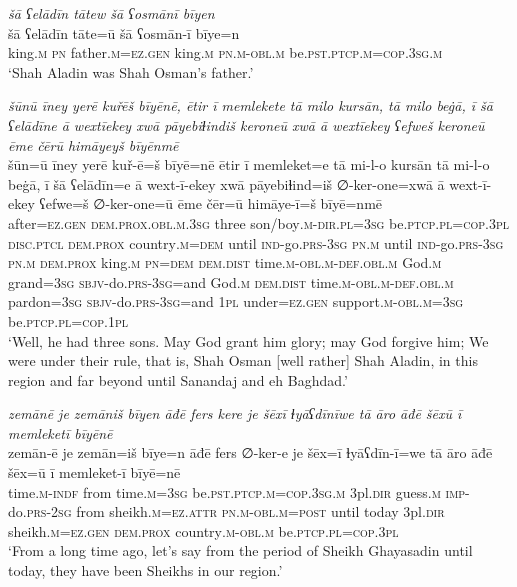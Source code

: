 \ea \label{DG.2}
\textit{šā ʕelādīn tātew šā ʕosmānī bīyen} \\ 
\gll šā ʕelādīn tāte=ū šā ʕosmān-ī bīye=n \\ 
 king\textsc{.m} \textsc{pn} father\textsc{.m}\textsc{=ez}\textsc{.gen} king\textsc{.m} \textsc{pn}\textsc{.m}\textsc{-obl}\textsc{.m} be\textsc{.pst}\textsc{.ptcp}\textsc{.m}\textsc{=cop}\textsc{.3sg}\textsc{.m} \\ 
\glt `Shah Aladin was Shah Osman’s father.'
\z 
 
\ea \label{DG.4}
\textit{šūnū īney yerē kuřēš bīyēnē, ētir ī memlekete tā milo kursān, tā milo beġā, ī šā ʕelādīne ā wextīekey xwā pāyebiɫindiš keroneū xwā ā wextīekey ʕefweš keroneū ēme čērū himāyeyš bīyēnmē} \\ 
\gll šūn=ū īney yerē kuř-ē=š bīyē=nē ētir ī memleket=e tā mi-l-o kursān tā mi-l-o beġā, ī šā ʕelādīn=e ā wext-ī-ekey xwā pāyebiɫind=iš ∅-ker-one=xwā ā wext-ī-ekey ʕefwe=š ∅-ker-one=ū ēme čēr=ū himāye-ī=š bīyē=nmē \\ 
 after\textsc{=ez}\textsc{.gen} \textsc{dem.prox}\textsc{.obl}\textsc{.m}\textsc{.3sg} three son/boy\textsc{.m}\textsc{-dir}\textsc{.pl}\textsc{=3sg} be\textsc{.ptcp}\textsc{.pl}\textsc{=cop}\textsc{.3pl} \textsc{disc.ptcl} \textsc{dem.prox} country\textsc{.m}\textsc{=dem} until \textsc{ind-}go\textsc{.prs}\textsc{-3sg} \textsc{pn}\textsc{.m} until \textsc{ind-}go\textsc{.prs}\textsc{-3sg} \textsc{pn}\textsc{.m} \textsc{dem.prox} king\textsc{.m} \textsc{pn}\textsc{=dem} \textsc{dem.dist} time\textsc{.m}\textsc{-obl}\textsc{.m}\textsc{-def}\textsc{.obl}\textsc{.m} God\textsc{.m} grand\textsc{=3sg} \textsc{sbjv-}do\textsc{.prs}\textsc{-3sg}=and God\textsc{.m} \textsc{dem.dist} time\textsc{.m}\textsc{-obl}\textsc{.m}\textsc{-def}\textsc{.obl}\textsc{.m} pardon\textsc{=3sg} \textsc{sbjv-}do\textsc{.prs}\textsc{-3sg}=and \textsc{1pl} under\textsc{=ez}\textsc{.gen} support\textsc{.m}\textsc{-obl}\textsc{.m}\textsc{=3sg} be\textsc{.ptcp}\textsc{.pl}\textsc{=cop}\textsc{.1pl} \\ 
\glt `Well, he had three sons. May God grant him glory; may God forgive him; We were under their rule, that is, Shah Osman [well rather] Shah Aladin, in this region and far beyond until Sanandaj and eh Baghdad.'
\z 
 
\ea \label{DG.8}
\textit{zemānē je zemāniš bīyen āđē fers kere je šēxī ɫyāʕdīnīwe tā āro āđē šēxū ī memleketī bīyēnē} \\ 
\gll zemān-ē je zemān=iš bīye=n āđē fers ∅-ker-e je šēx=ī ɫyāʕdīn-ī=we tā āro āđē šēx=ū ī memleket-ī bīyē=nē \\ 
 time\textsc{.m}\textsc{-indf} from time\textsc{.m}\textsc{=3sg} be\textsc{.pst}\textsc{.ptcp}\textsc{.m}\textsc{=cop}\textsc{.3sg}\textsc{.m} 3pl\textsc{.dir} guess\textsc{.m} \textsc{imp-}do\textsc{.prs}-\textsc{2sg} from sheikh\textsc{.m}\textsc{=ez}.\textsc{attr} \textsc{pn}\textsc{.m}\textsc{-obl}\textsc{.m}\textsc{=\textsc{post}} until today 3pl\textsc{.dir} sheikh\textsc{.m}\textsc{=ez}\textsc{.gen} \textsc{dem.prox} country\textsc{.m}\textsc{-obl}\textsc{.m} be\textsc{.ptcp}\textsc{.pl}\textsc{=cop}\textsc{.3pl} \\ 
\glt `From a long time ago, let’s say from the period of Sheikh Ghayasadin until today, they have been Sheikhs in our region.'
\z 
 
